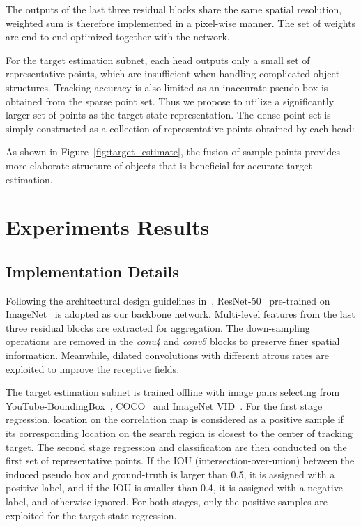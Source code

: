 \documentclass[runningheads]{llncs}
\begin{document}
The outputs of the last three residual blocks share the same
spatial resolution, weighted sum is therefore implemented in a pixel-wise manner.
The set of weights  are end-to-end optimized
together with the network.

For the target estimation subnet, each head outputs only a small set of
representative points, which are insufficient when handling complicated
object structures. Tracking accuracy is also limited as an inaccurate
pseudo box is obtained from the sparse point set. Thus we propose
to utilize a significantly larger set of points as the target state
representation. The dense point set is simply constructed as a
collection of representative points obtained by each head:


As shown in Figure~\ref{fig:target_estimate}, the fusion of sample points provides more
elaborate structure of objects that is beneficial for accurate target
estimation.

\section{Experiments Results}

\subsection{Implementation Details}

Following the architectural design guidelines in~\cite{CIR}, ResNet-50~\cite{resnet50}
pre-trained on ImageNet~\cite{imagenet} is adopted as our backbone network.
Multi-level features from the last three residual blocks are extracted
for aggregation. The down-sampling operations are removed in the
\emph{conv4} and \emph{conv5} blocks to preserve finer spatial
information. Meanwhile, dilated convolutions with different
atrous rates are exploited to improve the receptive fields.

The target estimation subnet is trained offline with image pairs
selecting from YouTube-BoundingBox~\cite{youtubebb}, COCO~\cite{coco} and ImageNet
VID~\cite{imagenet}. For the first stage regression, location  on the correlation map is considered as a positive sample
if its corresponding location on the search region is closest to the center of tracking target.
The second stage regression and
classification are then conducted on the first set of representative points. If the IOU (intersection-over-union)
between the induced pseudo box and ground-truth is larger than 0.5, it is assigned with a positive label, and
if the IOU is smaller than 0.4, it is assigned with a negative label, and otherwise ignored. For both stages,
only the positive samples are exploited for the target state regression.
\end{document}
